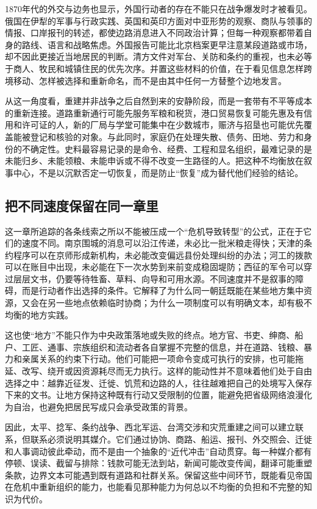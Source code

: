 1870年代的外交与边务也显示，外国行动者的存在不能只在战争爆发时才被看见。俄国在伊犁的军事与行政实践、英国和英印方面对中亚形势的观察、商队与领事的情报、口岸报刊的转述，都使边路消息进入不同政治计算；但每一种观察都带着自身的路线、语言和战略焦虑。外国报告可能比北京档案更早注意某段道路或市场，却不因此更接近当地居民的判断。清方文件对军台、关防和条约的重视，也未必等于商人、牧民和城镇住民的优先次序。并置这些材料的价值，在于看见信息怎样跨境移动、怎样被选择和重新命名，而不是由其中任何一方替整个边地发言。

从这一角度看，重建并非战争之后自然到来的安静阶段，而是一套带有不平等成本的重新连接。道路重新通行可能先服务军粮和税货，港口贸易恢复可能先惠及有信用和许可证的人，新的厂局与学堂可能集中在少数城市，赈济与招垦也可能优先覆盖能被登记和核验的对象。与此同时，家庭仍在处理失散、债务、田地、劳力和身份的不确定性。史料最容易记录的是命令、经费、工程和显名组织，最难记录的是未能归乡、未能领粮、未能申诉或不得不改变一生路径的人。把这种不均衡放在叙事中心，不是以沉默否定一切恢复，而是防止“恢复”成为替代他们经验的结论。

\subsection{把不同速度保留在同一章里}

这一章所追踪的各条线索之所以不能被压成一个“危机导致转型”的公式，正在于它们的速度不同。南京围城的消息可以沿江传递，未必比一批米粮走得快；天津的条约程序可以在京师形成新机构，未必能改变偏远县份处理纠纷的办法；河工的拨款可以在账目中出现，未必能在下一次水势到来前变成稳固堤防；西征的军令可以穿过层层文书，仍要等待牲畜、草料、向导和可用水源。不同速度并不是叙事的障碍，而是行动者作出选择的条件。它解释了为什么同一朝廷既能在某些地方集中资源，又会在另一些地点依赖临时协商；为什么一项制度可以有明确文本，却有极不均衡的地方实践。

这也使“地方”不能只作为中央政策落地或失败的终点。地方官、书吏、绅商、船户、工匠、通事、宗族组织和流动者各自掌握不完整的信息，并在道路、钱粮、暴力和亲属关系的约束下行动。他们可能把一项命令变成可执行的安排，也可能拖延、改写、绕开或因资源耗尽而无力执行。这样的能动性并不意味着他们处于自由选择之中：越靠近征发、迁徙、饥荒和边路的人，往往越难把自己的处境写入保存下来的文书。让地方保持这种既有行动又受限制的位置，能避免把省级网络浪漫化为自治，也避免把居民写成只会承受政策的背景。

因此，太平、捻军、条约战争、西北军运、台湾交涉和灾荒重建之间可以建立联系，但联系必须说明其媒介。它们通过协饷、商路、船运、报刊、外交照会、迁徙和人事调动彼此牵动，而不是由一个抽象的“近代冲击”自动贯穿。每一种媒介都有停顿、误读、截留与排除：钱款可能无法到站，新闻可能改变传闻，翻译可能重塑条款，边界文本可能遇到既有道路和社群关系。保留这些中间环节，既能看见帝国在危机中重新组织的能力，也能看见那种能力为何总以不均衡的负担和不完整的知识为代价。


